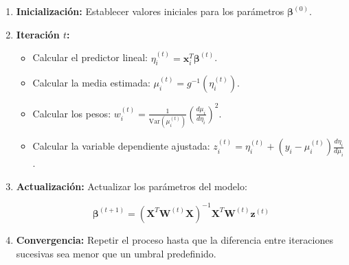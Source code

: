 \documentclass[
  letterpaper,
  DIV=11,
  numbers=noendperiod]{scrreprt}
\providecommand{\tightlist}{%
  \setlength{\itemsep}{0pt}\setlength{\parskip}{0pt}}
\begin{document}
\begin{enumerate}
\def\labelenumi{\arabic{enumi}.}
\item
  \textbf{Inicialización:} Establecer valores iniciales para los
  parámetros \(\boldsymbol{\beta}^{(0)}\).
\item
  \textbf{Iteración \(t\):}

  \begin{itemize}
  \tightlist
  \item
    Calcular el predictor lineal:
    \(\eta_i^{(t)} = \mathbf{x}_i^T \boldsymbol{\beta}^{(t)}\).
  \item
    Calcular la media estimada: \(\mu_i^{(t)} = g^{-1}(\eta_i^{(t)})\).
  \item
    Calcular los pesos:
    \(w_i^{(t)} = \frac{1}{\text{Var}(\mu_i^{(t)})} \left(\frac{d\mu_i}{d\eta_i}\right)^2\).
  \item
    Calcular la variable dependiente ajustada:
    \(z_i^{(t)} = \eta_i^{(t)} + (y_i - \mu_i^{(t)}) \frac{d\eta_i}{d\mu_i}\).
  \end{itemize}
\item
  \textbf{Actualización:} Actualizar los parámetros del modelo:

  \[\boldsymbol{\beta}^{(t+1)} = (\mathbf{X}^T \mathbf{W}^{(t)} \mathbf{X})^{-1} \mathbf{X}^T \mathbf{W}^{(t)} \mathbf{z}^{(t)}\]
\item
  \textbf{Convergencia:} Repetir el proceso hasta que la diferencia
  entre iteraciones sucesivas sea menor que un umbral predefinido.
\end{enumerate}
\end{document}
